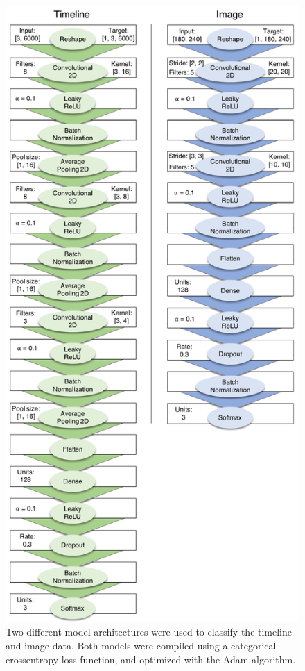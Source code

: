 \documentclass[
  english,
  man, donotrepeattitle,floatsintext]{apa6}
\begin{document}
\begin{figure}
\centering
\includegraphics{figures/models.pdf}
\caption{\label{fig:models}Two different model architectures were used to classify the timeline and image data. Both models were compiled using a categorical crossentropy loss function, and optimized with the Adam algorithm.}
\end{figure}
\end{document}
